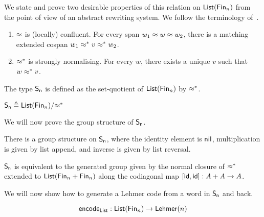 
We state and prove two desirable properties of this relation on $\List[\Fin[n]]$ from the point of view of an abstract
rewriting system. We follow the terminology of~\cite{krausCoherenceWellFoundednessTaming2020}. 

\begin{proposition}
  \leavevmode
  \begin{enumerate}
    \item $\cox$ is (locally) confluent. For every span $w_{1} \cox w \cox w_{2}$, there is a matching extended cospan
          $w_{1} \cox* v \cox* w_{2}$.
    \item $\cox*$ is strongly normalising. For every $w$, there exists a unique $v$ such that $w \cox* v$.
  \end{enumerate}
\end{proposition}

The type $\Sn$ is defined as the set-quotient of $\List[\Fin[n]]$ by $\cox*$.

\begin{definition}[$\Sn$]
  \(\Sn \defeq \quot{\List(\Fin[n])}{\cox*}\)
\end{definition}

We will now prove the group structure of $\Sn$.

\begin{proposition}
  There is a group structure on $\Sn$, where the identity element is $\operatorname{\mathsf{nil}}$, multiplication is given by list append, and
  inverse is given by list reversal.
\end{proposition}

\begin{proposition}
  $\Sn$ is equivalent to the generated group given by the normal closure of $\cox*$ extended to
  $\List(\Fin[n] + \Fin[n])$ along the codiagonal map $[\operatorname{\mathsf{id}},\operatorname{\mathsf{id}}] : A + A \to A$.
\end{proposition}

We will now show how to generate a Lehmer code from a word in $\Sn$ and back.

\begin{definition}
  \[
    \encode{\List} : \List[\Fin[n]] \to \Lehmer[n]
  \]
\end{definition}

